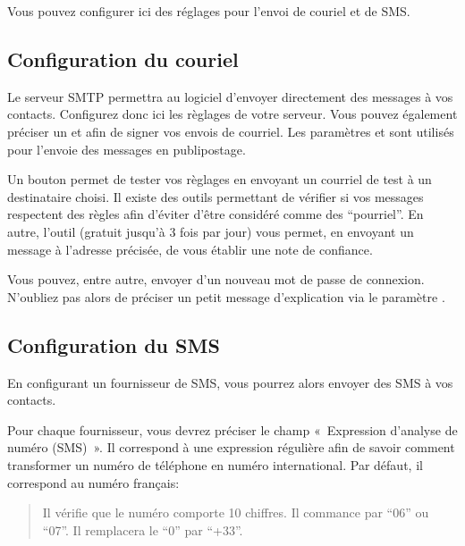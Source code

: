 \documentclass[letterpaper,10pt,french]{sphinxmanual}
\begin{document}
\sphinxAtStartPar
Vous pouvez configurer ici des réglages pour l’envoi de couriel et de SMS.


\subsection{Configuration du couriel}
\label{\detokenize{mailing/configuration:configuration-du-couriel}}
\sphinxAtStartPar
Le serveur SMTP permettra au logiciel d’envoyer directement des messages à vos contacts.
Configurez donc ici les règlages de votre serveur.
Vous pouvez également préciser un  et  afin de signer vos envois de courriel.
Les paramètres  et  sont utilisés pour l’envoie des messages en publipostage.

\sphinxAtStartPar
Un bouton  permet de tester vos règlages en envoyant un courriel de test à un destinataire choisi.
Il existe des outils permettant de vérifier si vos messages respectent des règles afin d’éviter d’être considéré comme des “pourriel”.
En autre, l’outil  (gratuit jusqu’à 3 fois par jour) vous permet, en envoyant un message à l’adresse précisée, de vous établir une note de confiance.

\sphinxAtStartPar
Vous pouvez, entre autre, envoyer d’un nouveau mot de passe de connexion.
N’oubliez pas alors de préciser un petit message d’explication via le paramètre .


\subsection{Configuration du SMS}
\label{\detokenize{mailing/configuration:configuration-du-sms}}
\sphinxAtStartPar
En configurant un fournisseur de SMS, vous pourrez alors envoyer des SMS à vos contacts.

\sphinxAtStartPar
Pour chaque fournisseur, vous devrez préciser le champ « Expression d’analyse de numéro (SMS) ».
Il correspond à une expression régulière afin de savoir comment transformer un numéro de téléphone en numéro international.
Par défaut, il correspond au numéro français: 
\begin{quote}

\sphinxAtStartPar
Il vérifie que le numéro comporte 10 chiffres.
Il commance par “06” ou “07”.
Il remplacera le “0” par “+33”.
\end{quote}
\end{document}

